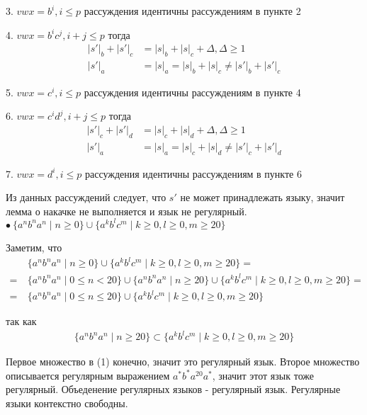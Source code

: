 3. $vwx = b^i, i \leq p$ рассуждения идентичны рассуждениям в пункте 2

4. $vwx = b^ic^j, i + j \leq p$ тогда
\begin{align*}
  |s'|_b + |s'|_c &= |s|_b + |s|_c + \Delta, \Delta \geq 1 \\
  |s'|_a &= |s|_a = |s|_b + |s|_c \neq |s'|_b + |s'|_c
\end{align*}

5. $vwx = c^i, i \leq p$ рассуждения идентичны рассуждениям в пункте 4

6. $vwx = c^id^j, i + j \leq p$ тогда
\begin{align*}
  |s'|_c + |s'|_d &= |s|_c + |s|_d + \Delta, \Delta \geq 1 \\
  |s'|_a &= |s|_a = |s|_c + |s|_d \neq |s'|_c + |s'|_d
\end{align*}

7. $vwx = d^i, i \leq p$ рассуждения идентичны рассуждениям в пункте 6

Из данных рассуждений следует, что $s'$ не может принадлежать языку,
значит лемма о накачке не выполняется и язык не регулярный.\\

$\bullet \: \{ a^nb^na^n \mid n \geq 0 \} \cup 
  \{a^kb^lc^m \mid k \geq 0, l \geq 0, m \geq 20 \}$

Заметим, что
\begin{align}
  &\{ a^nb^na^n \mid n \geq 0 \} \cup 
  \{a^kb^lc^m \mid k \geq 0, l \geq 0, m \geq 20 \} =\nonumber\\
  =\: &\{ a^nb^na^n \mid 0 \leq n < 20 \} \cup
  \{ a^nb^na^n \mid n \geq 20 \} \cup
  \{a^kb^lc^m \mid k \geq 0, l \geq 0, m \geq 20 \} =\nonumber\\
  =\: &\{ a^nb^na^n \mid 0 \leq n \leq 20 \} \cup
  \{a^kb^lc^m \mid k \geq 0, l \geq 0, m \geq 20 \}
\end{align}

так как
\begin{align*}
  \{ a^nb^na^n \mid n \geq 20 \} \subset
  \{a^kb^lc^m \mid k \geq 0, l \geq 0, m \geq 20 \}
\end{align*}

Первое множество в (1) конечно, значит это регулярный язык. 
Второе множество описывается регулярным выражением $a^*b^*a^{20}a^*$,
значит этот язык тоже регулярный. Объеденение регулярных языков -
регулярный язык. Регулярные языки контекстно свободны.
